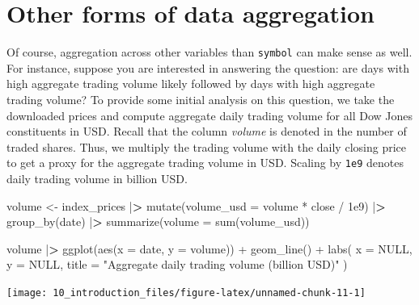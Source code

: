 \documentclass[
]{krantz}
\newenvironment{Shaded}{\begin{snugshade}}{\end{snugshade}}
\newcommand{\AttributeTok}[1]{\textcolor[rgb]{0.61,0.61,0.61}{#1}}
\newcommand{\ConstantTok}[1]{\textcolor[rgb]{0,0,0}{#1}}
\newcommand{\ErrorTok}[1]{\textcolor[rgb]{0.14,0.14,0.14}{\textbf{#1}}}
\newcommand{\FloatTok}[1]{\textcolor[rgb]{0.06,0.06,0.06}{#1}}
\newcommand{\FunctionTok}[1]{\textcolor[rgb]{0,0,0}{#1}}
\newcommand{\NormalTok}[1]{#1}
\newcommand{\OtherTok}[1]{\textcolor[rgb]{0.37,0.37,0.37}{#1}}
\newcommand{\SpecialCharTok}[1]{\textcolor[rgb]{0,0,0}{#1}}
\newcommand{\StringTok}[1]{\textcolor[rgb]{0.5,0.5,0.5}{#1}}
\begin{document}
\hypertarget{other-forms-of-data-aggregation}{%
\section{Other forms of data aggregation}\label{other-forms-of-data-aggregation}}

Of course, aggregation across other variables than \texttt{symbol} can make sense as well. For instance, suppose you are interested in answering the question: are days with high aggregate trading volume likely followed by days with high aggregate trading volume? To provide some initial analysis on this question, we take the downloaded prices and compute aggregate daily trading volume for all Dow Jones constituents in USD. Recall that the column \emph{volume} is denoted in the number of traded shares. Thus, we multiply the trading volume with the daily closing price to get a proxy for the aggregate trading volume in USD. Scaling by \texttt{1e9} denotes daily trading volume in billion USD.

\begin{Shaded}
\begin{Highlighting}[]
\NormalTok{volume }\OtherTok{\textless{}{-}}\NormalTok{ index\_prices }\SpecialCharTok{|}\ErrorTok{\textgreater{}}
  \FunctionTok{mutate}\NormalTok{(}\AttributeTok{volume\_usd =}\NormalTok{ volume }\SpecialCharTok{*}\NormalTok{ close }\SpecialCharTok{/} \FloatTok{1e9}\NormalTok{) }\SpecialCharTok{|}\ErrorTok{\textgreater{}}
  \FunctionTok{group\_by}\NormalTok{(date) }\SpecialCharTok{|}\ErrorTok{\textgreater{}}
  \FunctionTok{summarize}\NormalTok{(}\AttributeTok{volume =} \FunctionTok{sum}\NormalTok{(volume\_usd))}

\NormalTok{volume }\SpecialCharTok{|}\ErrorTok{\textgreater{}}
  \FunctionTok{ggplot}\NormalTok{(}\FunctionTok{aes}\NormalTok{(}\AttributeTok{x =}\NormalTok{ date, }\AttributeTok{y =}\NormalTok{ volume)) }\SpecialCharTok{+}
  \FunctionTok{geom\_line}\NormalTok{() }\SpecialCharTok{+}
  \FunctionTok{labs}\NormalTok{(}
    \AttributeTok{x =} \ConstantTok{NULL}\NormalTok{, }\AttributeTok{y =} \ConstantTok{NULL}\NormalTok{,}
    \AttributeTok{title =} \StringTok{"Aggregate daily trading volume (billion USD)"}
\NormalTok{  )}
\end{Highlighting}
\end{Shaded}

\begin{center}\texttt{[image: 10\_introduction\_files/figure-latex/unnamed-chunk-11-1]} \end{center}
\end{document}

